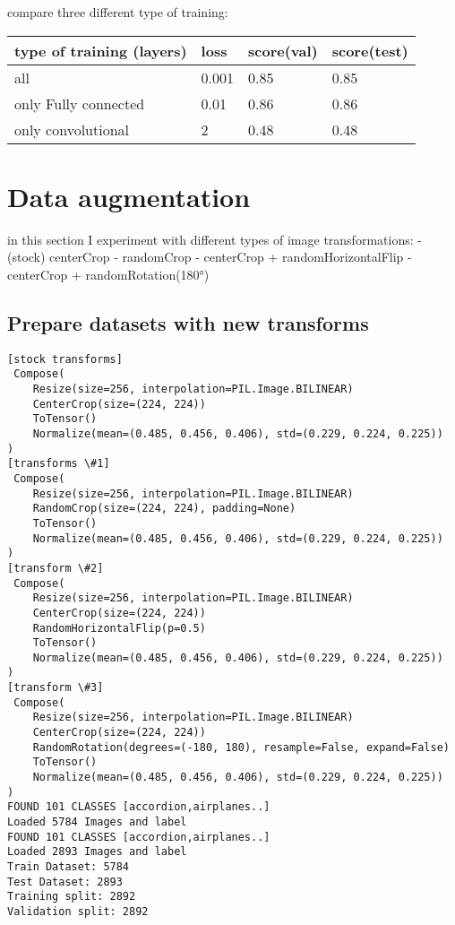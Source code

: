 \documentclass[11pt]{article}
\begin{document}
    
    compare three different type of training:

\begin{longtable}[]{@{}llll@{}}
\toprule
type of training (layers) & loss & score(val) &
score(test)\tabularnewline
\midrule
\endhead
all & 0.001 & 0.85 & 0.85\tabularnewline
only Fully connected & 0.01 & 0.86 & 0.86\tabularnewline
only convolutional & 2 & 0.48 & 0.48\tabularnewline
\bottomrule
\end{longtable}

    \hypertarget{data-augmentation}{%
\section{Data augmentation}\label{data-augmentation}}

in this section I experiment with different types of image
transformations: - (stock) centerCrop - randomCrop - centerCrop +
randomHorizontalFlip - centerCrop + randomRotation(180°)

    \hypertarget{prepare-datasets-with-new-transforms}{%
\subsection{Prepare datasets with new
transforms}\label{prepare-datasets-with-new-transforms}}

    \begin{Verbatim}[commandchars=\\\{\}]
[stock transforms]
 Compose(
    Resize(size=256, interpolation=PIL.Image.BILINEAR)
    CenterCrop(size=(224, 224))
    ToTensor()
    Normalize(mean=(0.485, 0.456, 0.406), std=(0.229, 0.224, 0.225))
)
[transforms \#1]
 Compose(
    Resize(size=256, interpolation=PIL.Image.BILINEAR)
    RandomCrop(size=(224, 224), padding=None)
    ToTensor()
    Normalize(mean=(0.485, 0.456, 0.406), std=(0.229, 0.224, 0.225))
)
[transform \#2]
 Compose(
    Resize(size=256, interpolation=PIL.Image.BILINEAR)
    CenterCrop(size=(224, 224))
    RandomHorizontalFlip(p=0.5)
    ToTensor()
    Normalize(mean=(0.485, 0.456, 0.406), std=(0.229, 0.224, 0.225))
)
[transform \#3]
 Compose(
    Resize(size=256, interpolation=PIL.Image.BILINEAR)
    CenterCrop(size=(224, 224))
    RandomRotation(degrees=(-180, 180), resample=False, expand=False)
    ToTensor()
    Normalize(mean=(0.485, 0.456, 0.406), std=(0.229, 0.224, 0.225))
)
FOUND 101 CLASSES [accordion,airplanes..]
Loaded 5784 Images and label
FOUND 101 CLASSES [accordion,airplanes..]
Loaded 2893 Images and label
Train Dataset: 5784
Test Dataset: 2893
Training split: 2892
Validation split: 2892
\end{Verbatim}
\end{document}
